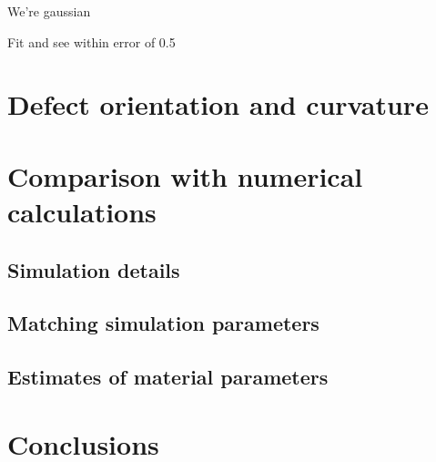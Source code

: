 We're gaussian

Fit and see within error of 0.5

\section{Defect orientation and curvature}

\section{Comparison with numerical calculations}
\subsection{Simulation details}
\subsection{Matching simulation parameters}
\subsection{Estimates of material parameters}

\section{Conclusions}
